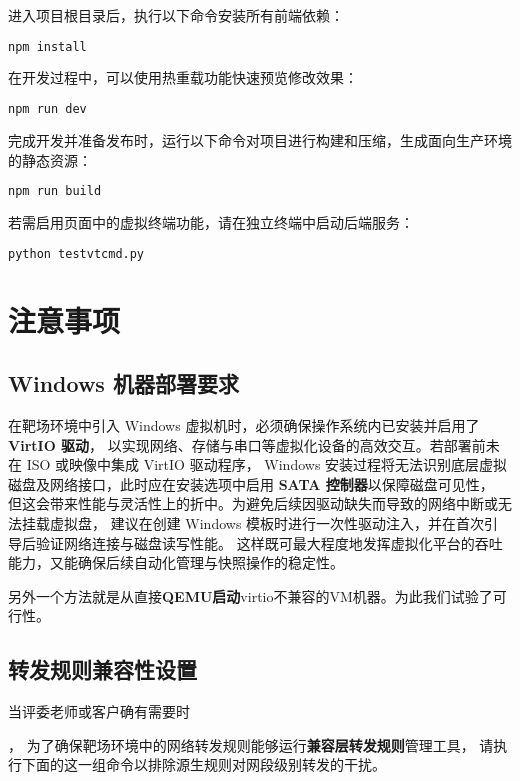 \documentclass[lang=cn,10pt]{elegantbook}
\begin{document}
进入项目根目录后，执行以下命令安装所有前端依赖：
\begin{lstlisting}[language=bash]
  npm install
\end{lstlisting}

在开发过程中，可以使用热重载功能快速预览修改效果：
\begin{lstlisting}[language=bash]
  npm run dev
\end{lstlisting}

完成开发并准备发布时，运行以下命令对项目进行构建和压缩，生成面向生产环境的静态资源：
\begin{lstlisting}[language=bash]
  npm run build
\end{lstlisting}

若需启用页面中的虚拟终端功能，请在独立终端中启动后端服务：
\begin{lstlisting}[language=bash]
  python testvtcmd.py
\end{lstlisting}





\section{注意事项}

\subsection{Windows 机器部署要求}
在靶场环境中引入 Windows 虚拟机时，必须确保操作系统内已安装并启用了 \textbf{VirtIO 驱动}，
以实现网络、存储与串口等虚拟化设备的高效交互。若部署前未在 ISO 或映像中集成 VirtIO 驱动程序，
Windows 安装过程将无法识别底层虚拟磁盘及网络接口，此时应在安装选项中启用 \textbf{SATA 控制器}以保障磁盘可见性，
但这会带来性能与灵活性上的折中。为避免后续因驱动缺失而导致的网络中断或无法挂载虚拟盘，
建议在创建 Windows 模板时进行一次性驱动注入，并在首次引导后验证网络连接与磁盘读写性能。
这样既可最大程度地发挥虚拟化平台的吞吐能力，又能确保后续自动化管理与快照操作的稳定性。

另外一个方法就是从直接\textbf{QEMU启动}virtio不兼容的VM机器。为此我们试验了可行性。


\subsection{转发规则兼容性设置}

\hypertarget{subsec:forward_setting}{当评委老师或客户确有需要时}，
为了确保靶场环境中的网络转发规则能够运行\textbf{兼容层转发规则}管理工具，
请执行下面的这一组命令以排除源生规则对网段级别转发的干扰。
\end{document}
